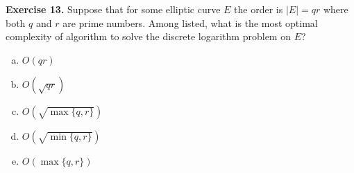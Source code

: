 \documentclass[../lecture-notes.tex]{subfiles}
\begin{document}
\textbf{Exercise 13.} Suppose that for some elliptic curve $E$ the order is $|E| = qr$ where both $q$ and $r$ are prime numbers. Among listed, what is the most optimal complexity of algorithm to solve the discrete logarithm problem on $E$?
\begin{enumerate}[a)]
    \item $O(qr)$
    \item $O(\sqrt{qr})$
    \item $O(\sqrt{\max\{q,r\}})$
    \item $O(\sqrt{\min\{q,r\}})$
    \item $O(\max\{q,r\})$
\end{enumerate}
\end{document}
